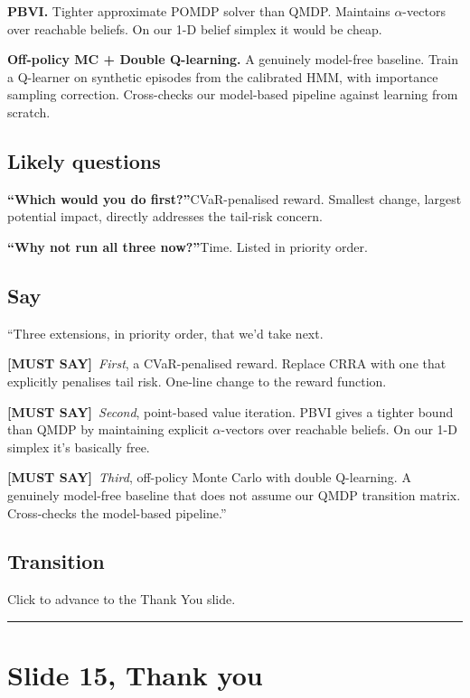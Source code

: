 \documentclass[11pt]{article}
\newcommand{\mustsay}[1]{\textcolor{must}{\textbf{[MUST SAY]}}\ #1}
\begin{document}
\textbf{PBVI.} Tighter approximate POMDP solver than QMDP. Maintains $\alpha$-vectors over reachable beliefs. On our 1-D belief simplex it would be cheap.

\textbf{Off-policy MC + Double Q-learning.} A genuinely model-free baseline. Train a Q-learner on synthetic episodes from the calibrated HMM, with importance sampling correction. Cross-checks our model-based pipeline against learning from scratch.

\subsection*{Likely questions}

\textbf{``Which would you do first?''}\quad CVaR-penalised reward. Smallest change, largest potential impact, directly addresses the tail-risk concern.

\textbf{``Why not run all three now?''}\quad Time. Listed in priority order.

\subsection*{Say}

``Three extensions, in priority order, that we'd take next.

\mustsay{\emph{First}, a CVaR-penalised reward. Replace CRRA with one that explicitly penalises tail risk. One-line change to the reward function.}

\mustsay{\emph{Second}, point-based value iteration. PBVI gives a tighter bound than QMDP by maintaining explicit $\alpha$-vectors over reachable beliefs. On our 1-D simplex it's basically free.}

\mustsay{\emph{Third}, off-policy Monte Carlo with double Q-learning. A genuinely model-free baseline that does not assume our QMDP transition matrix. Cross-checks the model-based pipeline.''}

\subsection*{Transition}

Click to advance to the Thank You slide.

\bigskip\hrule

\section*{Slide 15, Thank you}
\end{document}
